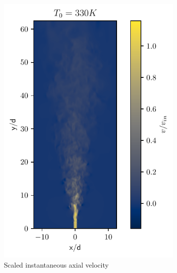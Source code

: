 \begin{figure}[htbp!]
\begin{subfigure}{0.25\textwidth}
	\centering
	\includegraphics[scale=.65]{figures/Plots/vertical/330/v_scaled_vert_330.pdf}
	\caption{Scaled instantaneous axial velocity} \label{330_v_1}
\end{subfigure}
\hfill
\begin{subfigure}{0.25\textwidth}
	\centering

\end{subfigure}
\end{figure}
